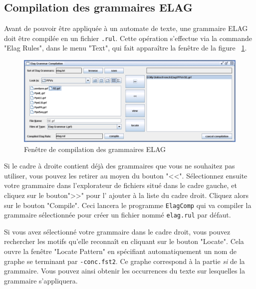 \subsection{Compilation des grammaires ELAG}
Avant de pouvoir être appliquée à un automate de texte, une grammaire ELAG doit être
compilée en un fichier \verb+.rul+.  Cette opération s’effectue via
la commande "Elag Rules", dans le menu "Text", qui fait apparaître la fenêtre de la figure
~\ref{fig-elag-rules}.

\begin{figure}[!ht]
\begin{center}
\includegraphics[width=15cm]{resources/img/fig7-16.png}
\caption{Fenêtre de compilation des grammaires ELAG\label{fig-elag-rules}}
\end{center}
\end{figure}

\bigskip
\noindent Si le cadre à droite contient déjà des grammaires que vous ne souhaitez pas utiliser, vous
pouvez les retirer au moyen du bouton "<<". Sélectionnez ensuite votre grammaire dans l’explorateur
de fichiers situé dans le cadre gauche, et cliquez sur le bouton">>" pour l’ ajouter à la liste du
cadre droit. Cliquez alors sur le bouton "Compile". Ceci lancera le programme \verb+ElagComp+
 qui va compiler la grammaire sélectionnée pour créer un
fichier nommé \verb+elag.rul+ par défaut.

\bigskip
\noindent Si vous avez sélectionné votre grammaire dans le cadre droit, vous pouvez rechercher les
motifs qu’elle reconnaît en cliquant sur le bouton "Locate". Cela ouvre la fenêtre "Locate Pattern"
en spécifiant automatiquement un nom de graphe se terminant par
\verb+-conc.fst2+.
Ce graphe correspond à la partie \textit{si} de la grammaire. Vous pouvez ainsi obtenir les
occurrences du texte sur lesquelles la grammaire s’appliquera.



